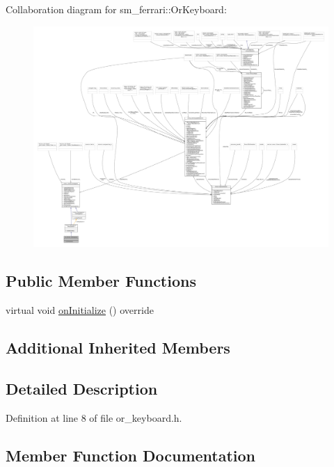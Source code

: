 Collaboration diagram for sm\+\_\+ferrari\+:\+:Or\+Keyboard\+:
\nopagebreak
\begin{figure}[H]
\begin{center}
\leavevmode
\includegraphics[width=350pt]{classsm__ferrari_1_1OrKeyboard__coll__graph}
\end{center}
\end{figure}
\subsection*{Public Member Functions}
\begin{DoxyCompactItemize}
\item 
virtual void \hyperlink{classsm__ferrari_1_1OrKeyboard_ac7c1dea6cff8b1cb6808a49c5a3ecb1c}{on\+Initialize} () override
\end{DoxyCompactItemize}
\subsection*{Additional Inherited Members}


\subsection{Detailed Description}


Definition at line 8 of file or\+\_\+keyboard.\+h.



\subsection{Member Function Documentation}
\mbox{\label{classsm__ferrari_1_1OrKeyboard_ac7c1dea6cff8b1cb6808a49c5a3ecb1c}} 
